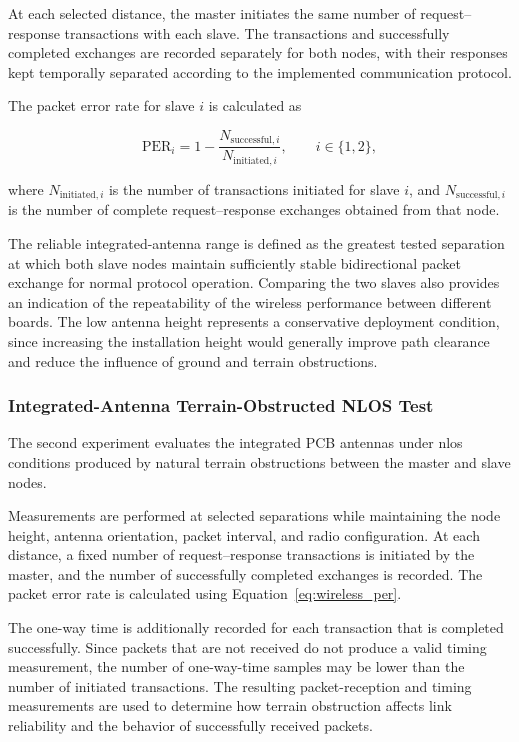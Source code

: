 At each selected distance, the master initiates the same number of request--response transactions with each slave. The transactions and successfully completed exchanges are recorded separately for both nodes, with their responses kept temporally separated according to the implemented communication protocol.

The packet error rate for slave \(i\) is calculated as

\begin{equation}
    \mathrm{PER}_i
    =
    1-
    \frac{N_{\mathrm{successful},i}}
    {N_{\mathrm{initiated},i}},
    \qquad
    i\in\{1,2\},
    \label{eq:wireless_per}
\end{equation}

where \(N_{\mathrm{initiated},i}\) is the number of transactions initiated for slave \(i\), and \(N_{\mathrm{successful},i}\) is the number of complete request--response exchanges obtained from that node.

The reliable integrated-antenna range is defined as the greatest tested separation at which both slave nodes maintain sufficiently stable bidirectional packet exchange for normal protocol operation. Comparing the two slaves also provides an indication of the repeatability of the wireless performance between different boards. The low antenna height represents a conservative deployment condition, since increasing the installation height would generally improve path clearance and reduce the influence of ground and terrain obstructions.

\subsubsection{Integrated-Antenna Terrain-Obstructed NLOS Test}

The second experiment evaluates the integrated PCB antennas under \acrshort{nlos} conditions produced by natural terrain obstructions between the master and slave nodes.

Measurements are performed at selected separations while maintaining the node height, antenna orientation, packet interval, and radio configuration. At each distance, a fixed number of request--response transactions is initiated by the master, and the number of successfully completed exchanges is recorded. The packet error rate is calculated using Equation~\ref{eq:wireless_per}.

The one-way time is additionally recorded for each transaction that is completed successfully. Since packets that are not received do not produce a valid timing measurement, the number of one-way-time samples may be lower than the number of initiated transactions. The resulting packet-reception and timing measurements are used to determine how terrain obstruction affects link reliability and the behavior of successfully received packets.

